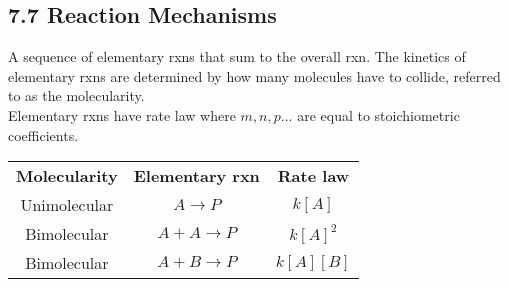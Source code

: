 \subsection{7.7 Reaction Mechanisms}
    A sequence of elementary rxns that sum to the overall rxn. The kinetics of elementary rxns are determined by
    how many molecules have to collide, referred to as the molecularity.\\
    Elementary rxns have rate law where $m,n,p\dots$ are equal to stoichiometric coefficients.
    \vspace*{0.5em}
    
    \begin{center}
        \begin{tabular}{ |c|c|c| } 
         \hline
         \textbf{Molecularity} & \textbf{Elementary rxn} & \textbf{Rate law} \\
         Unimolecular & $A \longrightarrow P$ & $k[A]$ \\
         Bimolecular & $A + A \longrightarrow P$ & $k[A]^2$ \\
         Bimolecular & $A + B \longrightarrow P$ & $k[A][B]$ \\
         \hline
        \end{tabular}
    \end{center}
    \vspace*{0.5em}